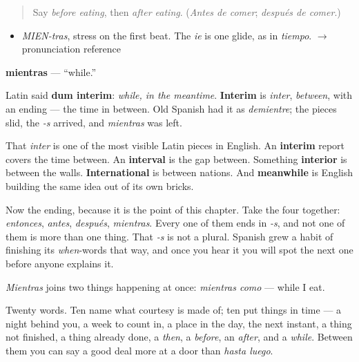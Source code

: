 \label{lesson:ES-C323-mientras}



\begin{quote}
Say \emph{before eating}, then \emph{after eating}. (\emph{Antes de comer}; \emph{después de comer}.)
\end{quote}

\begin{sounds}
\begin{itemize}
\raggedright
  \item \emph{MIEN-tras}, stress on the first beat. The \emph{ie} is one glide, as in \emph{tiempo}. $\to$ pronunciation reference
\end{itemize}
\end{sounds}

\begin{cousinweb}
\textbf{mientras} — \textquotedblleft{}while.\textquotedblright{}

Latin said \textbf{dum interim}: \emph{while, in the meantime}. \textbf{Interim} is \emph{inter}, \emph{between}, with an ending — the time in between. Old Spanish had it as \emph{demientre}; the pieces slid, the \emph{-s} arrived, and \emph{mientras} was left.

That \emph{inter} is one of the most visible Latin pieces in English. An \textbf{interim} report covers the time between. An \textbf{interval} is the gap between. Something \textbf{interior} is between the walls. \textbf{International} is between nations. And \textbf{meanwhile} is English building the same idea out of its own bricks.

Now the ending, because it is the point of this chapter. Take the four together: \emph{entonces}, \emph{antes}, \emph{después}, \emph{mientras}. Every one of them ends in \emph{-s}, and not one of them is more than one thing. That \emph{-s} is not a plural. Spanish grew a habit of finishing its \emph{when}-words that way, and once you hear it you will spot the next one before anyone explains it.

\emph{Mientras} joins two things happening at once: \emph{mientras como} — while I eat.
\end{cousinweb}

\begin{grammarlens}[title={What you've built}]
Twenty words. Ten name what courtesy is made of; ten put things in time — a night behind you, a week to count in, a place in the day, the next instant, a thing not finished, a thing already done, a \emph{then}, a \emph{before}, an \emph{after}, and a \emph{while}. Between them you can say a good deal more at a door than \emph{hasta luego}.
\end{grammarlens}

